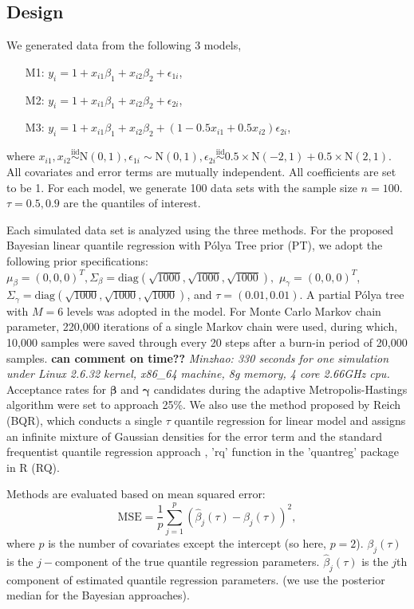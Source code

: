 \documentclass[12pt]{article}
\newcommand{\polya}{P\'{o}lya}
\begin{document}
\subsection{Design}
We generated data from the following 3 models,
\begin{itemize}
\item [M1:] $y_i = 1 + x_{i1}\beta_1 + x_{i2}\beta_2 + \epsilon_{1i}$,
\item [M2:] $y_i = 1 + x_{i1}\beta_1 + x_{i2}\beta_2 + \epsilon_{2i}$,
\item [M3:]  $y_i = 1 + x_{i1}\beta_1 + x_{i2}\beta_2 +
  (1-0.5x_{i1}+0.5x_{i2}) \epsilon_{2i}$,
\end{itemize}
where $x_{i1} , x_{i2} \stackrel{\text{iid}}{\sim} \mathrm{N}(0,1),
\epsilon_{1i} \sim \mathrm{N}(0,1), \epsilon_{2i}
\stackrel{\text{iid}}{\sim} 0.5 \times \mathrm{N}(-2,1) +
0.5 \times \mathrm{N}(2,1)
$. All covariates and error terms are mutually independent. All
coefficients are set to be 1. For each model, we generate 100 data
sets with the sample size $n=100$. $\tau=0.5, 0.9$ are the quantiles
of interest.

Each simulated data set is analyzed using the three methods. For the proposed
Bayesian linear quantile regression with \polya{} Tree prior (PT),
we adopt the following prior specifications: $\mu_{\beta} = (0,0,0)^T,
\Sigma_{\beta}=\text{diag} (\sqrt{1000},\sqrt{1000},\sqrt{1000}), $
$\mu_{\gamma} = (0,0,0)^T$,
$\Sigma_{\gamma}=\text{diag} (\sqrt{1000},\sqrt{1000},\sqrt{1000}) $,
and $\tau=(0.01, 0.01)$. A partial \polya{} tree with $M=6$ levels was adopted
in the model. For Monte Carlo Markov chain parameter, 220,000
iterations of a single Markov chain were used, during which, 10,000
samples were saved through every 20 steps after a burn-in period of
20,000 samples. {\bf can comment on time??} {\it Minzhao: 330 seconds
  for one simulation
  under Linux 2.6.32 kernel, x86\_64 machine, 8g memory, 4 core
  2.66GHz cpu.} Acceptance rates for $\bm{\beta}$ and $\bm{\gamma}$ candidates
during the adaptive Metropolis-Hastings algorithm were set to approach
25\%.
We also use the method proposed by Reich (BQR),
which conducts a single $\tau$
quantile regression for linear model and assigns an infinite mixture
of Gaussian densities for the error term and the
standard frequentist quantile regression approach , 'rq' function in
the 'quantreg' package in R (RQ).

Methods are evaluated  based on mean squared error:
\begin{displaymath}
  \text{MSE}  = \frac{1}{p} \sum_{j=1}^p (\hat{\beta}_j(\tau) -
  \beta_j(\tau))^2,
\end{displaymath}
where $p$ is the number of covariates except the intercept (so here,
$p=2$). $\beta_j(\tau)$ is the
$j-$component of the true quantile regression
parameters. $\hat{\beta}_j(\tau)$ is the  $j$th component of estimated
quantile regression parameters. (we use the posterior median for
the Bayesian approaches).
\end{document}
